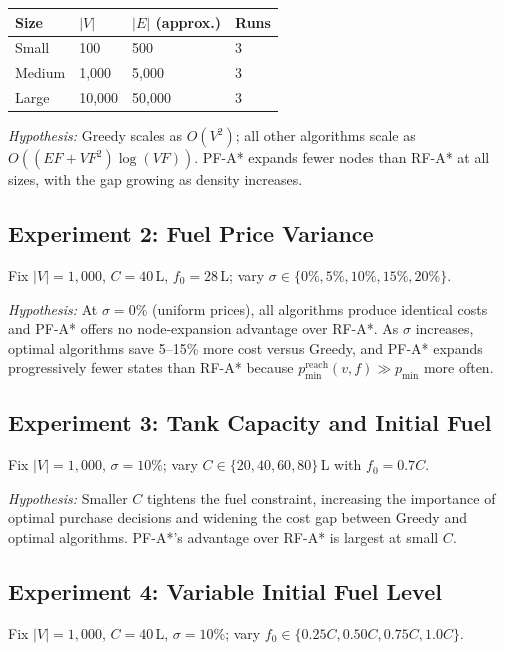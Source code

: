 \begin{center}
\begin{tabular}{llll}
\toprule
Size & $|V|$ & $|E|$ (approx.) & Runs \\
\midrule
Small  & 100    & 500    & 3 \\
Medium & 1,000  & 5,000  & 3 \\
Large  & 10,000 & 50,000 & 3 \\
\bottomrule
\end{tabular}
\end{center}

\textit{Hypothesis:} Greedy scales as $O(V^{2})$; all other algorithms scale as
$O((EF+VF^{2})\log(VF))$.
PF-A* expands fewer nodes than RF-A* at all sizes, with the gap growing as density
increases.

\subsection{Experiment 2: Fuel Price Variance}

Fix $|V|=1{,}000$, $C=40$\,L, $f_0=28$\,L; vary $\sigma \in \{0\%,5\%,10\%,15\%,20\%\}$.

\textit{Hypothesis:} At $\sigma=0\%$ (uniform prices), all algorithms produce identical costs
and PF-A* offers no node-expansion advantage over RF-A*.
As $\sigma$ increases, optimal algorithms save 5--15\% more cost versus Greedy, and PF-A*
expands progressively fewer states than RF-A* because
$p_{\min}^{\mathrm{reach}}(v,f) \gg p_{\min}$ more often.

\subsection{Experiment 3: Tank Capacity and Initial Fuel}

Fix $|V|=1{,}000$, $\sigma=10\%$; vary $C \in \{20,40,60,80\}$\,L with $f_0=0.7C$.

\textit{Hypothesis:} Smaller $C$ tightens the fuel constraint, increasing the importance of
optimal purchase decisions and widening the cost gap between Greedy and optimal algorithms.
PF-A*'s advantage over RF-A* is largest at small $C$.

\subsection{Experiment 4: Variable Initial Fuel Level}

Fix $|V|=1{,}000$, $C=40$\,L, $\sigma=10\%$; vary
$f_0 \in \{0.25C, 0.50C, 0.75C, 1.0C\}$.

